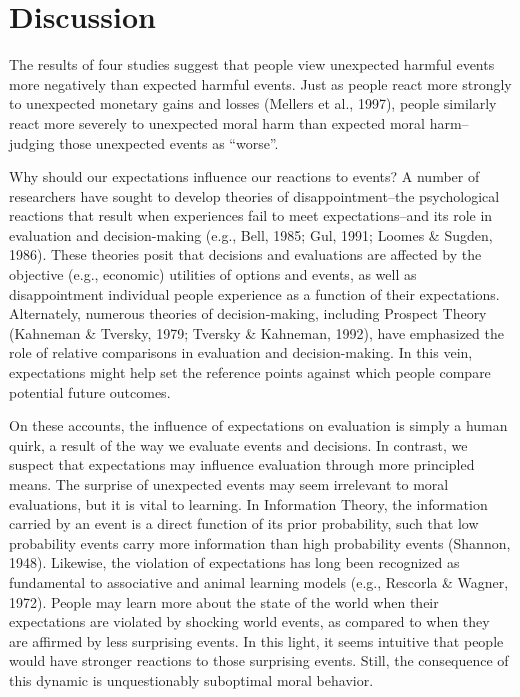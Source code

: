 \documentclass[10pt, letterpaper]{article}
\begin{document}
\section{Discussion}\label{discussion}

The results of four studies suggest that people view unexpected harmful
events more negatively than expected harmful events. Just as people
react more strongly to unexpected monetary gains and losses (Mellers et
al., 1997), people similarly react more severely to unexpected moral
harm than expected moral harm--judging those unexpected events as
``worse''.

Why should our expectations influence our reactions to events? A number
of researchers have sought to develop theories of disappointment--the
psychological reactions that result when experiences fail to meet
expectations--and its role in evaluation and decision-making (e.g.,
Bell, 1985; Gul, 1991; Loomes \& Sugden, 1986). These theories posit
that decisions and evaluations are affected by the objective (e.g.,
economic) utilities of options and events, as well as disappointment
individual people experience as a function of their expectations.
Alternately, numerous theories of decision-making, including Prospect
Theory (Kahneman \& Tversky, 1979; Tversky \& Kahneman, 1992), have
emphasized the role of relative comparisons in evaluation and
decision-making. In this vein, expectations might help set the reference
points against which people compare potential future outcomes.

On these accounts, the influence of expectations on evaluation is simply
a human quirk, a result of the way we evaluate events and decisions. In
contrast, we suspect that expectations may influence evaluation through
more principled means. The surprise of unexpected events may seem
irrelevant to moral evaluations, but it is vital to learning. In
Information Theory, the information carried by an event is a direct
function of its prior probability, such that low probability events
carry more information than high probability events (Shannon, 1948).
Likewise, the violation of expectations has long been recognized as
fundamental to associative and animal learning models (e.g., Rescorla \&
Wagner, 1972). People may learn more about the state of the world when
their expectations are violated by shocking world events, as compared to
when they are affirmed by less surprising events. In this light, it
seems intuitive that people would have stronger reactions to those
surprising events. Still, the consequence of this dynamic is
unquestionably suboptimal moral behavior.
\end{document}
